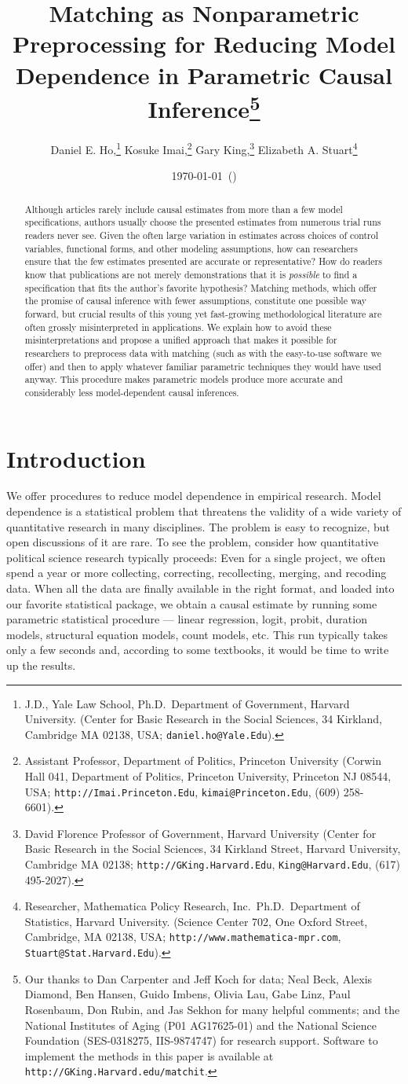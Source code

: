 \documentclass[11pt,titlepage]{article}
\title{Matching as Nonparametric Preprocessing for Reducing Model
  Dependence in Parametric Causal Inference\thanks{Our thanks to Dan
    Carpenter and Jeff Koch for data; Neal Beck, Alexis Diamond, Ben
    Hansen, Guido Imbens, Olivia Lau, Gabe Linz, Paul Rosenbaum, Don
    Rubin, and Jas Sekhon for many helpful comments; and the National
    Institutes of Aging (P01 AG17625-01) and the National Science
    Foundation (SES-0318275, IIS-9874747) for research support.
    Software to implement the methods in this paper is available at
    \texttt{http://GKing.Harvard.edu/matchit}.}}
\author{Daniel E. Ho,\thanks{J.D., Yale Law School, Ph.D.\,
    Department of Government, Harvard University. (Center for Basic
    Research in the Social Sciences, 34 Kirkland, Cambridge MA 02138,
    USA; \texttt{daniel.ho@Yale.Edu}).}
  Kosuke Imai,\thanks{Assistant Professor, Department of Politics,
    Princeton University (Corwin Hall 041, Department of Politics,
    Princeton University, Princeton NJ 08544, USA;
    \texttt{http://Imai.Princeton.Edu}, \texttt{kimai@Princeton.Edu},
    (609) 258-6601).}
  Gary King,\thanks{David Florence Professor of Government, Harvard
    University (Center for Basic Research in the Social Sciences, 34
    Kirkland Street, Harvard University, Cambridge MA 02138;
    \texttt{http://GKing.Harvard.Edu}, \texttt{King@Harvard.Edu},
    (617) 495-2027).}
Elizabeth A. Stuart\thanks{Researcher, Mathematica Policy Research,
  Inc.\, Ph.D.\, Department of Statistics, Harvard University.
  (Science Center 702, One Oxford Street, Cambridge, MA 02138, USA;
  \texttt{http://www.mathematica-mpr.com},
  \texttt{Stuart@Stat.Harvard.Edu}).}}
\date{\today\ (\printtime)}
\begin{document}
\maketitle

\begin{abstract}
  Although articles rarely include causal estimates from more than a
  few model specifications, authors usually choose the presented
  estimates from numerous trial runs readers never see.  Given the
  often large variation in estimates across choices of control
  variables, functional forms, and other modeling assumptions, how can
  researchers ensure that the few estimates presented are accurate or
  representative?  How do readers know that publications are not
  merely demonstrations that it is \emph{possible} to find a
  specification that fits the author's favorite hypothesis?  Matching
  methods, which offer the promise of causal inference with fewer
  assumptions, constitute one possible way forward, but crucial
  results of this young yet fast-growing methodological literature are
  often grossly misinterpreted in applications.  We explain how to
  avoid these misinterpretations and propose a unified approach that
  makes it possible for researchers to preprocess data with matching
  (such as with the easy-to-use software we offer) and then to apply
  whatever familiar parametric techniques they would have used anyway.
  This procedure makes parametric models produce more accurate and
  considerably less model-dependent causal inferences.
\end{abstract}

\section{Introduction}

We offer procedures to reduce model dependence in empirical research.
Model dependence is a statistical problem that threatens the validity
of a wide variety of quantitative research in many disciplines.  The
problem is easy to recognize, but open discussions of it are rare.  To
see the problem, consider how quantitative political science research
typically proceeds: Even for a single project, we often spend a year
or more collecting, correcting, recollecting, merging, and recoding
data.  When all the data are finally available in the right format,
and loaded into our favorite statistical package, we obtain a causal
estimate by running some parametric statistical procedure --- linear
regression, logit, probit, duration models, structural equation
models, count models, etc.  This run typically takes only a few
seconds and, according to some textbooks, it would be time to write up
the results.
\end{document}

